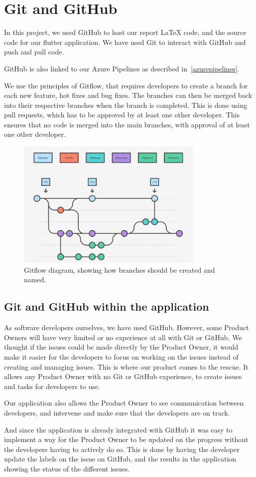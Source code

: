 \section{Git and GitHub}
In this project, we used GitHub to host our report LaTeX code, and the source code for our flutter application.
We have used Git to interact with GitHub and push and pull code. 

GitHub is also linked to our Azure Pipelines as described in~\autoref{azurepipelines}.

We use the principles of Gitflow, that requires developers to create a branch for each new feature, hot fixes and bug fixes. 
The branches can then be merged back into their respective branches when the branch is completed.
This is done using pull requests, which has to be approved by at least one other developer.
This ensures that no code is merged into the main branches, with approval of at least one other developer.

\begin{figure}[H]
    \centering
    \includegraphics[width=0.8\textwidth]{images/GitFlow.png}
    \caption{Gitflow diagram, showing how branches should be created and named.}
    \label{Gitflow}
\end{figure}

\subsection{Git and GitHub within the application}
As software developers ourselves, we have used GitHub.
However, some Product Owners will have very limited or no experience at all with Git or GitHub.
We thought if the issues could be made directly by the Product Owner, it would make it easier for the developers to focus on working on the issues instead of creating and managing issues. 
This is where our product comes to the rescue.
It allows any Product Owner with no Git or GitHub experience, to create issues and tasks for developers to use.

Our application also allows the Product Owner to see communication between developers, and intervene and make sure that the developers are on track.

And since the application is already integrated with GitHub it was easy to implement a way for the Product Owner to be updated on the progress without the developers having to actively do so. This is done by having the developer update the labels on the issue on GitHub, and the results in the application showing the status of the different issues. 
